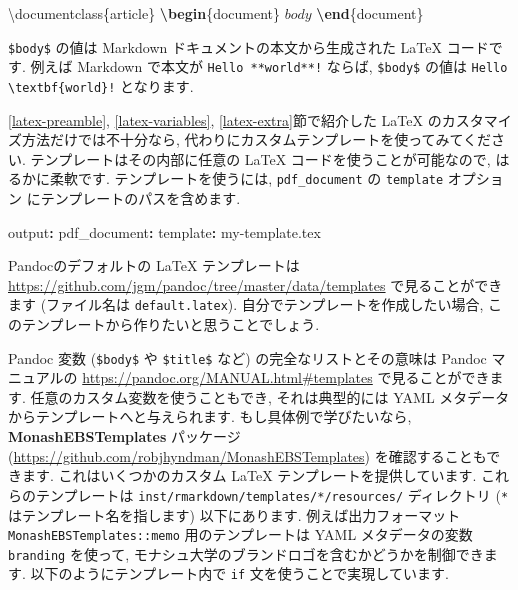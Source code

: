 \documentclass[
  11pt,
  lualatex,
  ja=standard]{bxjsreport}
\newenvironment{Shaded}{\begin{snugshade}}{\end{snugshade}}
\newcommand{\AttributeTok}[1]{\textcolor[rgb]{0.77,0.63,0.00}{#1}}
\newcommand{\BuiltInTok}[1]{#1}
\newcommand{\ExtensionTok}[1]{#1}
\newcommand{\FunctionTok}[1]{\textcolor[rgb]{0.00,0.00,0.00}{#1}}
\newcommand{\KeywordTok}[1]{\textcolor[rgb]{0.13,0.29,0.53}{\textbf{#1}}}
\newcommand{\NormalTok}[1]{#1}
\newcommand{\SpecialStringTok}[1]{\textcolor[rgb]{0.31,0.60,0.02}{#1}}
\begin{document}
\begin{Shaded}
\begin{Highlighting}[]
\BuiltInTok{\textbackslash{}documentclass}\NormalTok{\{}\ExtensionTok{article}\NormalTok{\}}
\KeywordTok{\textbackslash{}begin}\NormalTok{\{}\ExtensionTok{document}\NormalTok{\}}
\SpecialStringTok{$body$}
\KeywordTok{\textbackslash{}end}\NormalTok{\{}\ExtensionTok{document}\NormalTok{\}}
\end{Highlighting}
\end{Shaded}

\texttt{\$body\$} の値は Markdown ドキュメントの本文から生成された LaTeX コードです. 例えば Markdown で本文が \texttt{Hello **world**!} ならば, \texttt{\$body\$} の値は \texttt{Hello \textbackslash{}textbf\{world\}!} となります.

\ref{latex-preamble}, \ref{latex-variables}, \ref{latex-extra}節で紹介した LaTeX のカスタマイズ方法だけでは不十分なら, 代わりにカスタムテンプレートを使ってみてください. テンプレートはその内部に任意の LaTeX コードを使うことが可能なので, はるかに柔軟です. テンプレートを使うには, \texttt{pdf\_document} の \texttt{template} オプション にテンプレートのパスを含めます.

\begin{Shaded}
\begin{Highlighting}[]
\FunctionTok{output}\KeywordTok{:}
\AttributeTok{  }\FunctionTok{pdf\_document}\KeywordTok{:}
\AttributeTok{    }\FunctionTok{template}\KeywordTok{:}\AttributeTok{ my{-}template.tex}
\end{Highlighting}
\end{Shaded}

Pandocのデフォルトの LaTeX テンプレートは \url{https://github.com/jgm/pandoc/tree/master/data/templates} で見ることができます (ファイル名は \texttt{default.latex}). 自分でテンプレートを作成したい場合, このテンプレートから作りたいと思うことでしょう.

Pandoc 変数 (\texttt{\$body\$} や \texttt{\$title\$} など) の完全なリストとその意味は Pandoc マニュアルの \url{https://pandoc.org/MANUAL.html\#templates} で見ることができます. 任意のカスタム変数を使うこともでき, それは典型的には YAML メタデータからテンプレートへと与えられます. もし具体例で学びたいなら, \textbf{MonashEBSTemplates} パッケージ (\url{https://github.com/robjhyndman/MonashEBSTemplates}) を確認することもできます. これはいくつかのカスタム LaTeX テンプレートを提供しています. これらのテンプレートは \texttt{inst/rmarkdown/templates/*/resources/} ディレクトリ (\texttt{*} はテンプレート名を指します) 以下にあります. 例えば出力フォーマット \texttt{MonashEBSTemplates::memo} 用のテンプレートは YAML メタデータの変数 \texttt{branding} を使って, モナシュ大学のブランドロゴを含むかどうかを制御できます. 以下のようにテンプレート内で \texttt{if} 文を使うことで実現しています.
\end{document}
